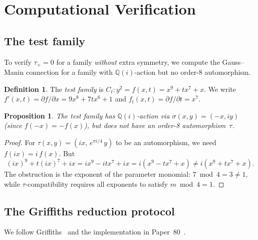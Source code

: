 \documentclass[11pt]{article}
\theoremstyle{plain}
\newtheorem{proposition}[theorem]{Proposition}
\theoremstyle{definition}
\newtheorem{definition}[theorem]{Definition}
\theoremstyle{remark}
\newcommand{\Q}{\mathbb{Q}}
\begin{document}
\section{Computational Verification}\label{sec:computation}

\subsection{The test family}

To verify $\tau_+ = 0$ for a family \emph{without} extra symmetry,
we compute the Gauss--Manin connection for a family with
$\Q(i)$-action but no order-8 automorphism.

\begin{definition}
The \emph{test family} is $C_t\colon y^2 = f(x,t) = x^9 + tx^7 + x$.
We write $f'(x,t) = \partial f / \partial x = 9x^8 + 7tx^6 + 1$ and
$f_t(x,t) = \partial f / \partial t = x^7$.
\end{definition}

\begin{proposition}\label{prop:test-symm}
The test family has $\Q(i)$-action via $\sigma(x,y) = (-x, iy)$
(since $f(-x) = -f(x)$), but does \emph{not} have an order-8
automorphism~$\tau$.
\end{proposition}

\begin{proof}
For $\tau(x,y) = (ix,\, e^{\pi i/4}\, y)$ to be an automorphism,
we need $f(ix) = i\, f(x)$. But
\[
  (ix)^9 + t(ix)^7 + ix = ix^9 - itx^7 + ix = i(x^9 - tx^7 + x)
  \ne i(x^9 + tx^7 + x).
\]
The obstruction is the exponent of the parameter monomial: $7 \bmod 4
= 3 \ne 1$, while $\tau$-compatibility requires all exponents to
satisfy $m \bmod 4 = 1$.
\end{proof}

\subsection{The Griffiths reduction protocol}\label{sec:griff-protocol}

We follow Griffiths~\cite{Griffiths1969} and the implementation in
Paper~80~\cite{Lee2026p80}.
\end{document}

